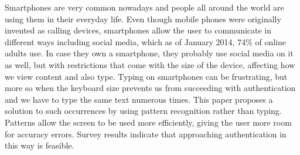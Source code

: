 


\begin{abstracts}        %
Smartphones are very common nowadays and people all around the world are using them in their everyday life. Even though mobile phones were originally invented as calling devices, smartphones allow the user to communicate in different ways including social media, which as of January 2014, 74\% of online adults use. In case they own a smartphone, they probably use social media on it as well, but with restrictions that come with the size of the device, affecting how we view content and also type. Typing on smartphones can be frustrating, but more so when the keyboard size prevents us from succeeding with authentication and we have to type the same text numerous times. This paper proposes a solution to such occurrences by using pattern recognition rather than typing. Patterns allow the screen to be used more efficiently, giving the user more room for accuracy errors. Survey results indicate that approaching authentication in this way is feasible.




\end{abstracts}


